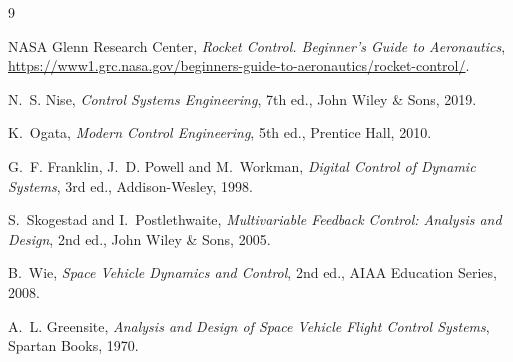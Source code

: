 \documentclass[article, 11pt]{IEEEtran}   %
\begin{document}
\begin{thebibliography}{9}

NASA Glenn Research Center, \emph{Rocket Control. Beginner's Guide to Aeronautics}, \url{https://www1.grc.nasa.gov/beginners-guide-to-aeronautics/rocket-control/}.

N.~S. Nise, \emph{Control Systems Engineering}, 7th ed., John Wiley \& Sons, 2019.

K.~Ogata, \emph{Modern Control Engineering}, 5th ed., Prentice Hall, 2010.

G.~F. Franklin, J.~D. Powell and M.~Workman, \emph{Digital Control of Dynamic Systems}, 3rd ed., Addison-Wesley, 1998.

S.~Skogestad and I.~Postlethwaite, \emph{Multivariable Feedback Control: Analysis and Design}, 2nd ed., John Wiley \& Sons, 2005.

B.~Wie, \emph{Space Vehicle Dynamics and Control}, 2nd ed., AIAA Education Series, 2008.

A.~L. Greensite, \emph{Analysis and Design of Space Vehicle Flight Control Systems}, Spartan Books, 1970.

\end{thebibliography}
\end{document}
